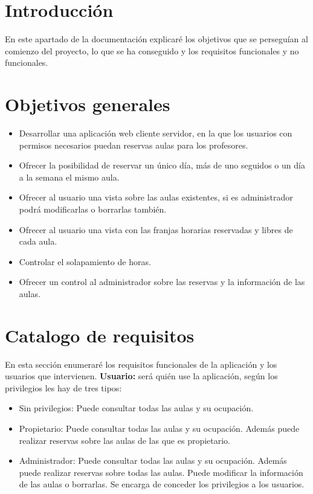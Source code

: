 
\section{Introducción}
En este apartado de la documentación explicaré  los objetivos que se perseguían al comienzo del proyecto, lo que se ha conseguido y los requisitos funcionales y no funcionales.
\section{Objetivos generales}
\begin{itemize}
	\item Desarrollar una aplicación web cliente servidor, en la que los usuarios con permisos necesarios puedan reservas aulas para los profesores.
	\item Ofrecer la posibilidad de reservar un único día, más de uno seguidos o un día a la semana el mismo aula.
	\item Ofrecer al usuario una vista sobre las aulas existentes, si es administrador podrá modificarlas o borrarlas también.
	\item Ofrecer al usuario una vista con las franjas horarias reservadas y libres de cada aula.
	\item Controlar el solapamiento de horas.
	\item Ofrecer un control al administrador sobre las reservas y la información de las aulas.
\end{itemize}
\section{Catalogo de requisitos}
En esta sección enumeraré los requisitos funcionales de la aplicación y los usuarios que intervienen.\newline
\textbf{Usuario:} será quién use la aplicación, según los privilegios les hay de tres tipos:
    \begin{itemize}
        \item Sin privilegios: Puede consultar todas las aulas y su ocupación.
        \item Propietario: Puede consultar todas las aulas y su ocupación. Además puede realizar reservas sobre las aulas de las que es propietario.
        \item Administrador: Puede consultar todas las aulas y su ocupación. Además puede realizar reservas sobre todas las aulas. Puede modificar la información de las aulas o borrarlas. Se encarga de conceder los privilegios a los usuarios.
    \end{itemize}
